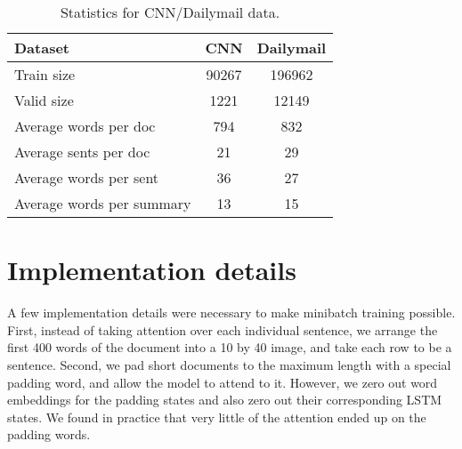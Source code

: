 \documentclass[11pt]{report}
\begin{document}
\begin{table}[h]
\centering
\begin{tabular}{lcc}
\toprule
Dataset  & CNN & Dailymail \\
\midrule
Train size & 90267 & 196962 \\
Valid size & 1221 & 12149 \\
Average words per doc & 794 & 832\\
Average sents per doc & 21 & 29\\
Average words per sent & 36 & 27\\
Average words per summary & 13 & 15 \\
\bottomrule
\end{tabular}
\caption{Statistics for CNN/Dailymail data.}
\label{data_stats}
\end{table}



%

\section{Implementation details}

A few implementation details were necessary to make minibatch training possible. First, instead of taking attention over each individual sentence, we arrange the first 400 words of the document into a 10 by 40 image, and take each row to be a sentence. Second, we pad short documents to the maximum length with a special padding word, and allow the model to attend to it. However, we zero out word embeddings for the padding states and also zero out their corresponding LSTM states. We found in practice that very little of the attention ended up on the padding words.
\end{document}
